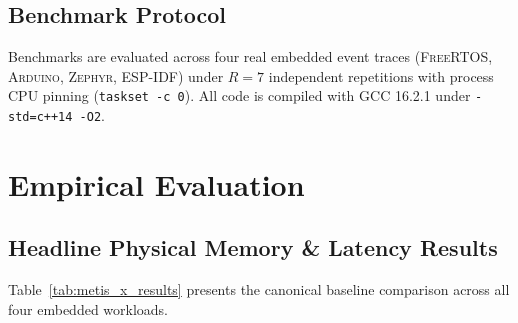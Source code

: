 \documentclass[conference]{IEEEtran}
\begin{document}
\subsection{Benchmark Protocol}
Benchmarks are evaluated across four real embedded event traces (\textsc{FreeRTOS}, \textsc{Arduino}, \textsc{Zephyr}, \textsc{ESP-IDF}) under $R=7$ independent repetitions with process CPU pinning (\texttt{taskset -c 0}). All code is compiled with GCC 16.2.1 under \texttt{-std=c++14 -O2}.

\section{Empirical Evaluation}

\subsection{Headline Physical Memory \& Latency Results}
Table~\ref{tab:metis_x_results} presents the canonical baseline comparison across all four embedded workloads.
\end{document}
